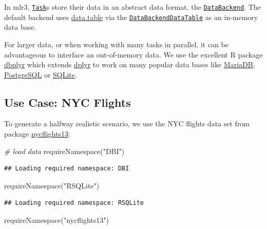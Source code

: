 \documentclass[
]{scrbook}
\newenvironment{Shaded}{\begin{snugshade}}{\end{snugshade}}
\newcommand{\CommentTok}[1]{\textcolor[rgb]{0.56,0.35,0.01}{\textit{#1}}}
\newcommand{\FunctionTok}[1]{\textcolor[rgb]{0.00,0.00,0.00}{#1}}
\newcommand{\NormalTok}[1]{#1}
\newcommand{\StringTok}[1]{\textcolor[rgb]{0.31,0.60,0.02}{#1}}
\renewenvironment{Shaded} {\begin{snugshade}\small} {\end{snugshade}}
\begin{document}
In mlr3, \href{https://mlr3.mlr-org.com/reference/Task.html}{\texttt{Task}}s store their data in an abstract data format, the \href{https://mlr3.mlr-org.com/reference/DataBackend.html}{\texttt{DataBackend}}.
The default backend uses \href{https://cran.r-project.org/package=data.table}{data.table} via the \href{https://mlr3.mlr-org.com/reference/DataBackendDataTable.html}{\texttt{DataBackendDataTable}} as an in-memory data base.

For larger data, or when working with many tasks in parallel, it can be advantageous to interface an out-of-memory data.
We use the excellent R package \href{https://cran.r-project.org/package=dbplyr}{dbplyr} which extends \href{https://cran.r-project.org/package=dplyr}{dplyr} to work on many popular data bases like \href{https://mariadb.org/}{MariaDB}, \href{https://www.postgresql.org/}{PostgreSQL} or \href{https://www.sqlite.org}{SQLite}.

\hypertarget{use-case-nyc-flights}{%
\subsection{Use Case: NYC Flights}\label{use-case-nyc-flights}}

To generate a halfway realistic scenario, we use the NYC flights data set from package \href{https://cran.r-project.org/package=nycflights13}{nycflights13}:

\begin{Shaded}
\begin{Highlighting}[]
\CommentTok{\# load data}
\FunctionTok{requireNamespace}\NormalTok{(}\StringTok{"DBI"}\NormalTok{)}
\end{Highlighting}
\end{Shaded}

\begin{verbatim}
## Loading required namespace: DBI
\end{verbatim}

\begin{Shaded}
\begin{Highlighting}[]
\FunctionTok{requireNamespace}\NormalTok{(}\StringTok{"RSQLite"}\NormalTok{)}
\end{Highlighting}
\end{Shaded}

\begin{verbatim}
## Loading required namespace: RSQLite
\end{verbatim}

\begin{Shaded}
\begin{Highlighting}[]
\FunctionTok{requireNamespace}\NormalTok{(}\StringTok{"nycflights13"}\NormalTok{)}
\end{Highlighting}
\end{Shaded}
\end{document}

